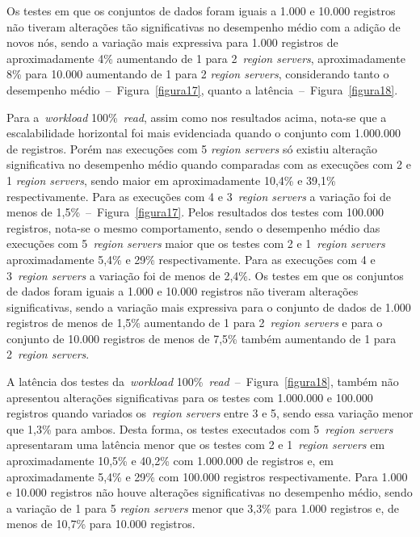 \documentclass[12pt]{article}
\begin{document}
Os testes em que os conjuntos de dados foram iguais a 1.000 e 10.000 registros não tiveram alterações tão significativas no desempenho médio com a adição de novos nós, sendo a variação mais expressiva para 1.000 registros de aproximadamente 4\% aumentando de 1 para 2~\emph{region servers}, aproximadamente 8\% para 10.000 aumentando de 1 para 2 \emph{region servers}, considerando tanto o desempenho médio~--~Figura~\ref{figura17}, quanto a latência~--~Figura~\ref{figura18}.


Para a~\emph{workload} 100\%~\emph{read}, assim como nos resultados acima, nota-se que a escalabilidade horizontal foi mais evidenciada quando o conjunto com 1.000.000 de registros. 
Porém nas execuções com 5 \emph{region servers} só existiu alteração significativa no desempenho médio quando comparadas com as execuções com 2 e 1 \emph{region servers}, sendo maior em aproximadamente 10,4\% e 39,1\% respectivamente. 
Para as execuções com 4 e 3~\emph{region servers} a variação foi de menos de 1,5\%~--~Figura~\ref{figura17}. Pelos resultados dos testes com 100.000 registros, nota-se o mesmo comportamento, sendo o desempenho médio das execuções com 5~\emph{region servers} maior que os testes com 2 e 1~\emph{region servers} aproximadamente 5,4\% e 29\% respectivamente. 
Para as execuções com 4 e 3~\emph{region servers} a variação foi de menos de 2,4\%. Os testes em que os conjuntos de dados foram iguais a 1.000 e 10.000 registros não tiveram alterações significativas, sendo a variação mais expressiva para o conjunto de dados de 1.000 registros de menos de 1,5\% aumentando de 1 para 2~\emph{region servers} e para o conjunto de 10.000 registros de menos de 7,5\% também aumentando de 1 para 2~\emph{region servers}.

A latência dos testes da~\emph{workload} 100\%~\emph{read}~--~Figura~\ref{figura18}, também não apresentou alterações significativas para os testes com 1.000.000 e 100.000 registros quando variados os~\emph{region servers} entre 3 e 5, sendo essa variação menor que 1,3\% para ambos. 
Desta forma, os testes executados com 5~\emph{region servers} apresentaram uma latência menor que os testes com 2 e 1~\emph{region servers} em aproximadamente 10,5\% e 40,2\% com 1.000.000 de registros e, em aproximadamente 5,4\% e 29\% com 100.000 registros respectivamente. 
Para 1.000 e 10.000 registros não houve alterações significativas no desempenho médio, sendo a variação de 1 para 5 \emph{region servers} menor que 3,3\% para 1.000 registros e, de menos de 10,7\% para 10.000 registros.
\end{document}

